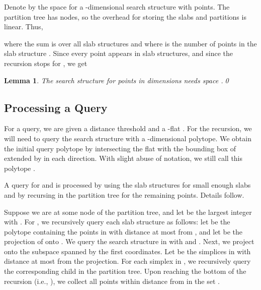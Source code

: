 \documentclass[a4paper,11pt]{paper}
\newtheorem{lemma}[theorem]{Lemma}
\begin{document}
Denote by  the space for a -dimensional search
structure with  points.
The partition tree  has  nodes, so the
overhead for storing the slabs and partitions is linear.
Thus,

where the sum is over all slab structures  and where  is the
number of points in the slab structure . Since every
point appears in  slab structures, and since the
recursion stops for , we get
\begin{lemma}
 \label{lem:space}
 The search structure for  points in  dimensions needs space
.\qed
\end{lemma}

\subsection{Processing a Query}

For a query, we are given a distance threshold  and a
-flat . For the recursion, we will need to query
the search structure with a -dimensional
polytope.  We obtain the initial query polytope by
intersecting the flat  with the bounding box of 
extended by  in each direction. With  slight abuse of
notation, we still call this polytope .

A query for  and  is processed by using the
slab structures for small enough slabs and by recursing in
the partition tree for the remaining points. Details follow.

Suppose we are at some node  of the partition tree, and
let  be the largest integer
with . For , we
recursively query each slab structure  as follows: let
 be the polytope containing the points
in  with distance at most 
from , and let  be the projection of 
onto .  We
query the search structure in  with  and .
Next, we project  onto the
subspace  spanned by the first  coordinates.
Let  be the simplices in  with
distance at most  from the projection.  For each simplex
in , we recursively query the corresponding child in
the partition tree. Upon reaching the bottom of the recursion
(i.e., ), we collect all points within distance
 from  in the set .
\end{document}
